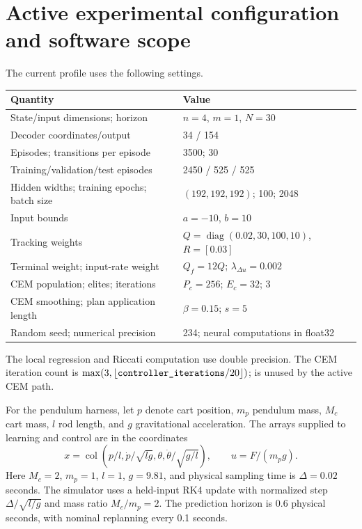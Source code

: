 \documentclass[11pt]{article}
\newcommand{\col}{\operatorname{col}}
\newcommand{\code}[1]{\texttt{\detokenize{#1}}}
\begin{document}
\section{Active experimental configuration and software scope}
The current \code{dev} profile uses the following settings.
\begin{center}
\small
\begin{tabular}{@{}ll@{}}
\toprule
Quantity & Value\\\midrule
State/input dimensions; horizon & $n=4$, $m=1$, $N=30$\\
Decoder coordinates/output & 34 / 154\\
Episodes; transitions per episode & 3500; 30\\
Training/validation/test episodes & 2450 / 525 / 525\\
Hidden widths; training epochs; batch size & $(192,192,192)$; 100; 2048\\
Input bounds & $a=-10$, $b=10$\\
Tracking weights & $Q=\operatorname{diag}(0.02,30,100,10)$, $R=[0.03]$\\
Terminal weight; input-rate weight & $Q_f=12Q$; $\lambda_{\Delta u}=0.002$\\
CEM population; elites; iterations & $P_c=256$; $E_c=32$; 3\\
CEM smoothing; plan application length & $\beta=0.15$; $s=5$\\
Random seed; numerical precision & 234; neural computations in float32\\\bottomrule
\end{tabular}
\end{center}
The local regression and Riccati computation use double precision. The CEM iteration count is $\max(3,\lfloor\code{controller_iterations}/20\rfloor)$; \code{controller_lr} is unused by the active CEM path.

For the pendulum harness, let $p$ denote cart position, $m_p$ pendulum mass, $M_c$ cart mass, $l$ rod length, and $g$ gravitational acceleration. The arrays supplied to learning and control are in the coordinates
\begin{equation}\label{eq:units}
x=\col\left(p/l,\dot p/\sqrt{lg},\theta,\dot\theta/\sqrt{g/l}\right),\qquad u=F/(m_p g).
\end{equation}
Here $M_c=2$, $m_p=1$, $l=1$, $g=9.81$, and physical sampling time is $\Delta=0.02$ seconds. The simulator uses a held-input RK4 update with normalized step $\Delta/\sqrt{l/g}$ and mass ratio $M_c/m_p=2$. The prediction horizon is 0.6 physical seconds, with nominal replanning every 0.1 seconds.
\end{document}
